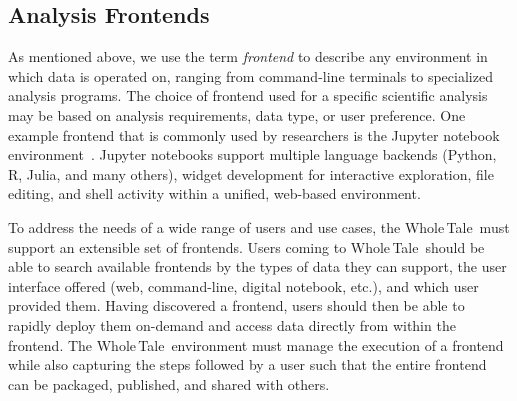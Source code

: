 \documentclass{elsarticle}
\newcommand{\wt}{Whole\,Tale}
\begin{document}
\subsection{Analysis Frontends}

As mentioned above, we use the term \emph{frontend} to describe any environment in which
data is operated on, ranging from command-line terminals to specialized analysis programs. The choice of frontend used for a specific scientific analysis
may be based on analysis requirements, data type, or user preference.
One example frontend that is commonly used by researchers is the Jupyter notebook environment~\cite{jupyter}. 
Jupyter notebooks support multiple language backends (Python, R, Julia, and many others), widget development for interactive exploration, file editing, and shell activity within a unified, web-based environment. 

To address the needs of a wide range of users and use cases, the \wt\ must support an extensible set of frontends. Users coming to \wt\ should be able to search available frontends by the types of data they can support,  the user interface offered (web, command-line, digital notebook, etc.), and which user provided them. 
Having discovered a frontend, users should then
be able to rapidly deploy them on-demand and access data
directly from within the frontend. %
The \wt\ environment must manage the execution of a frontend while
also capturing the steps followed by a user such that the entire frontend
can be packaged, published, and shared with others.
\end{document}

